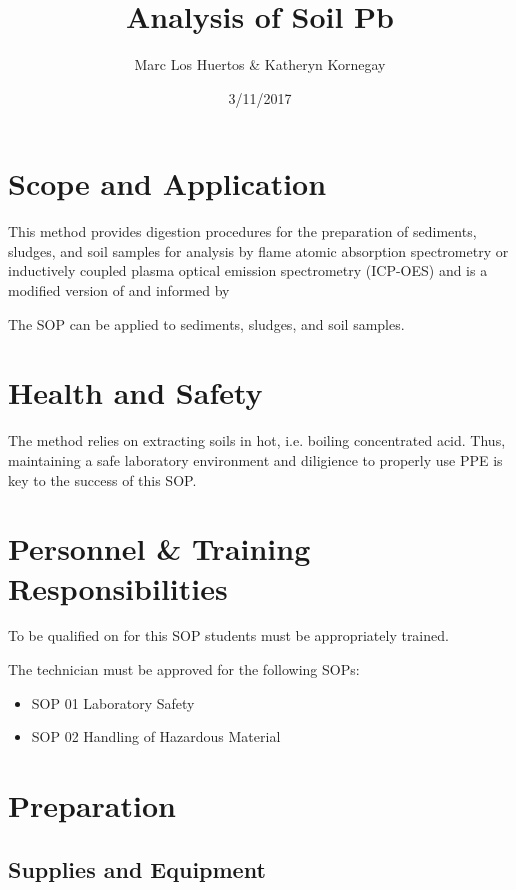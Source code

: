 \documentclass[12pt]{../SOP3_alpha}\usepackage[]{graphicx}\usepackage[]{color}
\title{Analysis of Soil Pb}
\date{3/11/2017}
\author{Marc Los Huertos \& Katheryn Kornegay}
\begin{document}
\maketitle

\section{Scope and Application}

\NP This method provides digestion procedures for the preparation of sediments, sludges, and soil samples for analysis by flame atomic absorption spectrometry or inductively coupled plasma optical emission spectrometry (ICP-OES) and is a modified version of \cite{EPA3050B} and informed by \cite{pena2011comparative, guven2011comparison} 

\NP The SOP can be applied to sediments, sludges, and soil samples.

\tableofcontents

\newpage

\section{Health and Safety}

\NP The method relies on extracting soils in hot, i.e. boiling concentrated acid. Thus, maintaining a safe laboratory environment and diligience to properly use PPE is key to the success of this SOP. 


\section{Personnel \& Training Responsibilities}

\NP To be qualified on for this SOP students must be appropriately trained.

The technician must be approved for the following SOPs:

\begin{itemize}
  \item SOP 01 Laboratory Safety
  \item SOP 02 Handling of Hazardous Material
\end{itemize}


\section{Preparation}

\subsection{Supplies and Equipment}
\end{document}
